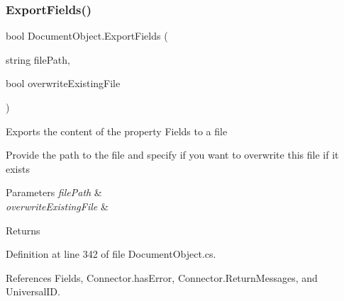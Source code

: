 \subsubsection{\texorpdfstring{Export\+Fields()}{ExportFields()}}
{\footnotesize\ttfamily bool Document\+Object.\+Export\+Fields (\begin{DoxyParamCaption}\item[{string}]{file\+Path,  }\item[{bool}]{overwrite\+Existing\+File }\end{DoxyParamCaption})}



Exports the content of the property \textquotesingle{}Fields\textquotesingle{} to a file 

Provide the path to the file and specify if you want to overwrite this file if it exists


\begin{DoxyParams}{Parameters}
{\em file\+Path} & \\
\hline
{\em overwrite\+Existing\+File} & \\
\hline
\end{DoxyParams}
\begin{DoxyReturn}{Returns}

\end{DoxyReturn}


Definition at line 342 of file Document\+Object.\+cs.



References Fields, Connector.\+has\+Error, Connector.\+Return\+Messages, and Universal\+ID.


